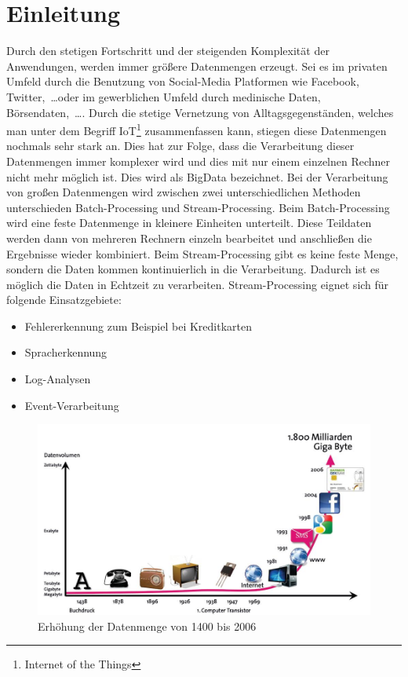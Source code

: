 \chapter{Einleitung}
Durch den stetigen Fortschritt und der steigenden Komplexität der Anwendungen,
werden immer größere Datenmengen erzeugt. Sei es im privaten Umfeld durch die
Benutzung von Social-Media Platformen wie Facebook, Twitter,~\dots oder im gewerblichen
Umfeld durch medinische Daten, Börsendaten,~\dots . Durch die stetige Vernetzung
von Alltagsgegenständen, welches man unter dem Begriff IoT\footnote{Internet of the Things}
zusammenfassen kann, stiegen diese Datenmengen nochmals sehr stark an. Dies hat
zur Folge, dass die Verarbeitung dieser Datenmengen immer komplexer wird und dies
mit nur einem einzelnen Rechner nicht mehr möglich ist. Dies wird als \gls{BigData}
bezeichnet. Bei der Verarbeitung von großen Datenmengen wird zwischen zwei
unterschiedlichen Methoden unterschieden Batch-Processing und Stream-Processing.
Beim Batch-Processing wird eine feste Datenmenge in kleinere Einheiten unterteilt.
Diese Teildaten werden dann von mehreren Rechnern einzeln bearbeitet und
anschließen die Ergebnisse wieder kombiniert. Beim Stream-Processing gibt es
keine feste Menge, sondern die Daten kommen kontinuierlich in die Verarbeitung.
Dadurch ist es möglich die Daten in Echtzeit zu verarbeiten. Stream-Processing
eignet sich für folgende Einsatzgebiete:

\begin{itemize}
\item Fehlererkennung zum Beispiel bei Kreditkarten
\item Spracherkennung
\item Log-Analysen
\item Event-Verarbeitung
\end{itemize}

\begin{figure}
\centering
\includegraphics[scale=0.375]{../material/images/bitkom-lf-bigdata-2012-data_grow.jpg}
\caption{Erhöhung der Datenmenge von 1400 bis 2006 \parencite{Weber2012}}
\label{fig:data-grow}
\end{figure}

